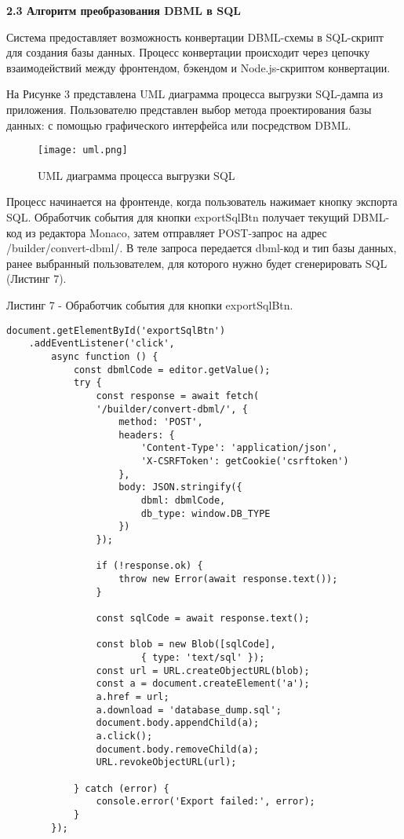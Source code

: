 \newpage
\textbf{\large 2.3 Алгоритм преобразования DBML в SQL}

Система предоставляет возможность конвертации DBML-схемы в SQL-скрипт для создания базы данных. Процесс конвертации происходит через цепочку взаимодействий между фронтендом, бэкендом и Node.js-скриптом конвертации.

На Рисунке 3 представлена UML диаграмма процесса выгрузки SQL-дампа из приложения. Пользователю представлен выбор метода проектирования базы данных: с помощью графического интерфейса или посредством DBML.

\renewcommand{\figurename}{Рисунок}
\begin{figure}[htbp]
    \centering %
    \texttt{[image: uml.png]} 
    \caption{UML диаграмма процесса выгрузки SQL}
    \label{fig:analyze} %
\end{figure}

Процесс начинается на фронтенде, когда пользователь нажимает кнопку экспорта SQL. Обработчик события для кнопки exportSqlBtn получает текущий DBML-код из редактора Monaco, затем отправляет POST-запрос на адрес /builder/convert-dbml/. В теле запроса передается dbml-код и тип базы данных, ранее выбранный пользователем, для которого нужно будет сгенерировать SQL (Листинг 7).

\newpage
Листинг 7 - Обработчик события для кнопки exportSqlBtn.
\begin{lstlisting}[frame=single]
document.getElementById('exportSqlBtn')
    .addEventListener('click',
        async function () {
            const dbmlCode = editor.getValue();
            try {
                const response = await fetch(
                '/builder/convert-dbml/', {
                    method: 'POST',
                    headers: {
                        'Content-Type': 'application/json',
                        'X-CSRFToken': getCookie('csrftoken')
                    },
                    body: JSON.stringify({
                        dbml: dbmlCode,
                        db_type: window.DB_TYPE
                    })
                });

                if (!response.ok) {
                    throw new Error(await response.text());
                }

                const sqlCode = await response.text();

                const blob = new Blob([sqlCode], 
                        { type: 'text/sql' });
                const url = URL.createObjectURL(blob);
                const a = document.createElement('a');
                a.href = url;
                a.download = 'database_dump.sql';
                document.body.appendChild(a);
                a.click();
                document.body.removeChild(a);
                URL.revokeObjectURL(url);

            } catch (error) {
                console.error('Export failed:', error);
            }
        });
\end{lstlisting}

